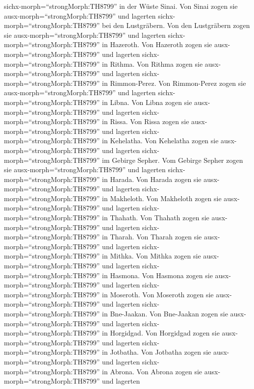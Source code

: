sichx-morph=``strongMorph:TH8799'' in der Wüste Sinai.  Von
Sinai zogen sie ausx-morph=``strongMorph:TH8799'' und lagerten
sichx-morph=``strongMorph:TH8799'' bei den Lustgräbern. 
Von den Lustgräbern zogen sie ausx-morph=``strongMorph:TH8799'' und
lagerten sichx-morph=``strongMorph:TH8799'' in Hazeroth. 
Von Hazeroth zogen sie ausx-morph=``strongMorph:TH8799'' und lagerten
sichx-morph=``strongMorph:TH8799'' in Rithma.  Von Rithma
zogen sie ausx-morph=``strongMorph:TH8799'' und lagerten
sichx-morph=``strongMorph:TH8799'' in Rimmon-Perez.  Von
Rimmon-Perez zogen sie ausx-morph=``strongMorph:TH8799'' und lagerten
sichx-morph=``strongMorph:TH8799'' in Libna.  Von Libna
zogen sie ausx-morph=``strongMorph:TH8799'' und lagerten
sichx-morph=``strongMorph:TH8799'' in Rissa.  Von Rissa
zogen sie ausx-morph=``strongMorph:TH8799'' und lagerten
sichx-morph=``strongMorph:TH8799'' in Kehelatha.  Von
Kehelatha zogen sie ausx-morph=``strongMorph:TH8799'' und lagerten
sichx-morph=``strongMorph:TH8799'' im Gebirge Sepher.  Vom
Gebirge Sepher zogen sie ausx-morph=``strongMorph:TH8799'' und lagerten
sichx-morph=``strongMorph:TH8799'' in Harada.  Von Harada
zogen sie ausx-morph=``strongMorph:TH8799'' und lagerten
sichx-morph=``strongMorph:TH8799'' in Makheloth.  Von
Makheloth zogen sie ausx-morph=``strongMorph:TH8799'' und lagerten
sichx-morph=``strongMorph:TH8799'' in Thahath.  Von Thahath
zogen sie ausx-morph=``strongMorph:TH8799'' und lagerten
sichx-morph=``strongMorph:TH8799'' in Tharah.  Von Tharah
zogen sie ausx-morph=``strongMorph:TH8799'' und lagerten
sichx-morph=``strongMorph:TH8799'' in Mithka.  Von Mithka
zogen sie ausx-morph=``strongMorph:TH8799'' und lagerten
sichx-morph=``strongMorph:TH8799'' in Hasmona.  Von Hasmona
zogen sie ausx-morph=``strongMorph:TH8799'' und lagerten
sichx-morph=``strongMorph:TH8799'' in Moseroth.  Von
Moseroth zogen sie ausx-morph=``strongMorph:TH8799'' und lagerten
sichx-morph=``strongMorph:TH8799'' in Bne-Jaakan.  Von
Bne-Jaakan zogen sie ausx-morph=``strongMorph:TH8799'' und lagerten
sichx-morph=``strongMorph:TH8799'' in Horgidgad.  Von
Horgidgad zogen sie ausx-morph=``strongMorph:TH8799'' und lagerten
sichx-morph=``strongMorph:TH8799'' in Jotbatha.  Von
Jotbatha zogen sie ausx-morph=``strongMorph:TH8799'' und lagerten
sichx-morph=``strongMorph:TH8799'' in Abrona.  Von Abrona
zogen sie ausx-morph=``strongMorph:TH8799'' und lagerten
